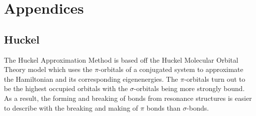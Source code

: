 \chapter{Appendices}
\label{appendix}
\section{Huckel}
\thispagestyle{myheadings}
The Huckel Approximation Method is based off the Huckel Molecular Orbital Theory model which uses the $\pi$-orbitals of a conjugated system to approximate the Hamiltonian and its corresponding eigenenergies. The $\pi$-orbitals turn out to be the highest occupied orbitals with the $\sigma$-orbitals being more strongly bound. As a result, the forming and breaking of bonds from resonance structures is easier to describe with the breaking and making of $\pi$ bonds than $\sigma$-bonds. \newline

